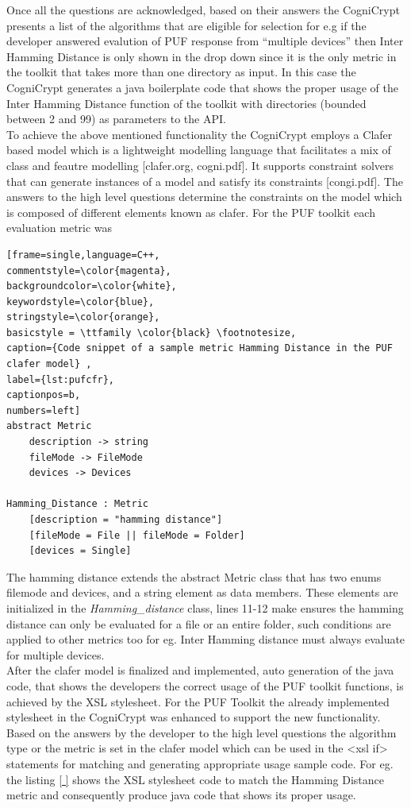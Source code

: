 Once all the questions are acknowledged, based on their answers the CogniCrypt presents a list of the algorithms that are eligible for selection for e.g if the developer answered evalution of PUF response from ``multiple devices'' then Inter Hamming Distance is only shown in the drop down since it is the only metric in the toolkit that takes more than one directory as input. In this case the CogniCrypt generates a java boilerplate code that shows the proper usage of the Inter Hamming Distance
function of the toolkit with directories (bounded between 2 and 99) as parameters to the API.\\

To achieve the above mentioned functionality the CogniCrypt employs a Clafer based model which is a lightweight modelling language that facilitates a mix of class and feautre modelling [clafer.org, cogni.pdf]. It supports constraint solvers that can generate instances of a model and satisfy its constraints [congi.pdf]. The answers to the high level questions determine the constraints on the model which is composed of different elements known as clafer. For the PUF toolkit each evaluation metric was

\begin{lstlisting}[frame=single,language=C++,
commentstyle=\color{magenta},
backgroundcolor=\color{white},
keywordstyle=\color{blue},
stringstyle=\color{orange},
basicstyle = \ttfamily \color{black} \footnotesize,
caption={Code snippet of a sample metric Hamming Distance in the PUF clafer model} ,
label={lst:pufcfr},
captionpos=b,
numbers=left]
abstract Metric
	description -> string
	fileMode -> FileMode
	devices -> Devices

Hamming_Distance : Metric
	[description = "hamming distance"]
	[fileMode = File || fileMode = Folder]
	[devices = Single]
\end{lstlisting}

The hamming distance extends the abstract Metric class that has two enums filemode and devices, and a string element as data members. These elements are initialized in the \emph{Hamming\_distance} class, lines 11-12 make ensures the hamming distance can only be evaluated for a file or an entire folder, such conditions are applied to other metrics too for eg. Inter Hamming distance must always evaluate for multiple devices.\\ 

After the clafer model is finalized and implemented, auto generation of the java code, that shows the developers the correct usage of the PUF toolkit functions, is achieved by the XSL stylesheet. For the PUF Toolkit the already implemented stylesheet in the CogniCrypt was enhanced to support the new functionality. Based on the answers by the developer to the high level questions the algorithm type or the metric is set in the clafer model which can be used in the <xsl if> statements
for matching and generating appropriate usage sample code. For eg. the listing \ref{ } shows the XSL stylesheet code to match the Hamming Distance metric and consequently produce java code that shows its proper usage.


